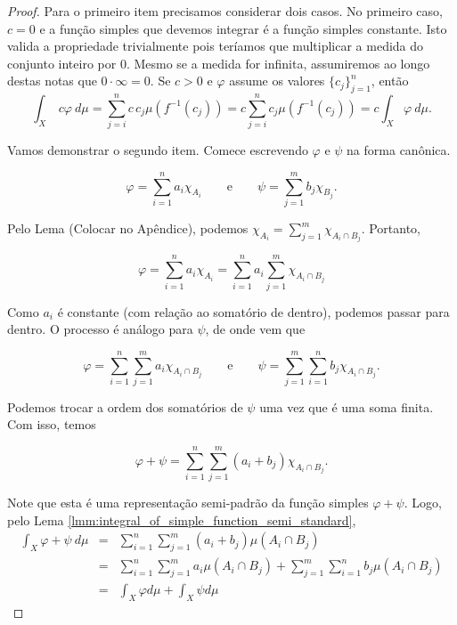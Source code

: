 \begin{proof}
    Para o primeiro item precisamos considerar dois casos. No primeiro caso, $c=0$ e a função simples que devemos integrar é a função simples constante. Isto valida a propriedade trivialmente pois teríamos que multiplicar a medida do conjunto inteiro por $0$. Mesmo se a medida for infinita, assumiremos ao longo destas notas que $0\cdot \infty=0$. Se $c > 0$ e $\varphi$ assume os valores $\{c_j\}_{j=1}^{n}$, então
    \begin{equation*}
        \int_{X}\ c\varphi \ d\mu = \sum_{j=i}^{n} c \, c_j \mu(f^{-1}(c_j)) = c\sum_{j=i}^{n}c_j \mu(f^{-1}(c_j))=c \int_{X}\varphi \ d\mu.
    \end{equation*}

    Vamos demonstrar o segundo item. Comece escrevendo $\varphi$ e $\psi$ na forma canônica.

    \begin{equation*}
        \varphi = \sum_{i=1}^{n} a_i \chi_{A_i} \quad \quad \text{e} \quad \quad 
        \psi = \sum_{j=1}^{m} b_j \chi_{B_j}.
    \end{equation*}

    Pelo Lema (Colocar no Apêndice), podemos $\chi_{A_i}=\sum_{j=1}^{m}\chi_{A_i\cap B_j}$. Portanto,

    \begin{equation*}
        \varphi = \sum_{i=1}^{n} a_i \chi_{A_i} = \sum_{i=1}^{n} a_i \sum_{j=1}^{m}\chi_{A_i\cap B_j}
    \end{equation*}

    Como $a_i$ é constante (com relação ao somatório de dentro), podemos passar para dentro. O processo é análogo para $\psi$, de onde vem que

    \begin{equation*}
        \varphi = \sum_{i=1}^{n}\sum_{j=1}^{m} a_i \chi_{A_i\cap B_j} \quad \quad \text{e} \quad \quad 
        \psi = \sum_{j=1}^{m}\sum_{i=1}^{n} b_j \chi_{A_i\cap B_j}.
    \end{equation*}

    Podemos trocar a ordem dos somatórios de $\psi$ uma vez que é uma soma finita. Com isso, temos

    \begin{equation*}
        \varphi + \psi = \sum_{i=1}^{n}\sum_{j=1}^{m} (a_i + b_j) \chi_{A_i\cap B_j}.
    \end{equation*}

    Note que esta é uma representação semi-padrão da função simples $\varphi+\psi$. Logo, pelo Lema \ref{lmm:integral_of_simple_function_semi_standard},
    \begin{eqnarray*}
        \int_X \varphi + \psi \ d\mu &=& \sum_{i=1}^{n}\sum_{j=1}^{m} (a_i + b_j) \mu(A_i\cap B_j)\\
        &=&\sum_{i=1}^{n}\sum_{j=1}^{m} a_i \mu(A_i\cap B_j) + \sum_{j=1}^{m}\sum_{i=1}^{n} b_j \mu(A_i\cap B_j)\\
        &=& \int_X \varphi d\mu + \int_X \psi d\mu
    \end{eqnarray*}
    
\end{proof}